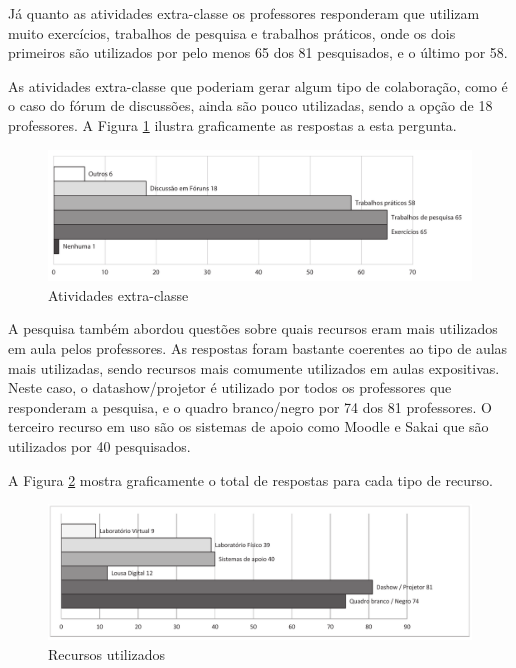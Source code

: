 Já quanto as atividades extra-classe os professores responderam que utilizam muito exercícios, trabalhos de pesquisa e trabalhos práticos, onde os dois primeiros são utilizados por pelo menos 65 dos 81 pesquisados, e o último por 58. 

As atividades extra-classe que poderiam gerar algum tipo de colaboração, como é o caso do fórum de discussões, ainda são pouco utilizadas, sendo a opção de 18 professores. A Figura \ref{fig:grafico_atividades_extra_classe} ilustra graficamente as respostas a esta pergunta.

 
\begin{figure}[!h]
\centering
\includegraphics[width=1.0\textwidth]{pdfs/professores/img-grafico-extra-classe.pdf} 
\caption{Atividades extra-classe}
\label{fig:grafico_atividades_extra_classe} 
\end{figure}



A pesquisa também abordou questões sobre quais recursos eram mais utilizados em aula pelos professores. As respostas foram bastante coerentes ao tipo de aulas mais utilizadas, sendo recursos mais comumente utilizados em aulas expositivas. Neste caso, o datashow/projetor é utilizado por todos os professores que responderam a pesquisa, e o quadro branco/negro por 74 dos 81 professores. O terceiro recurso em uso são os sistemas de apoio como Moodle e Sakai que são utilizados por 40 pesquisados.

A Figura \ref{fig:grafico_recursos} mostra graficamente o total de respostas para cada tipo de recurso.
 
\begin{figure}[!h]
\centering
\includegraphics[width=1.0\textwidth]{pdfs/professores/img-grafico-recursos.pdf} 
\caption{Recursos utilizados}
\label{fig:grafico_recursos} 
\end{figure}

